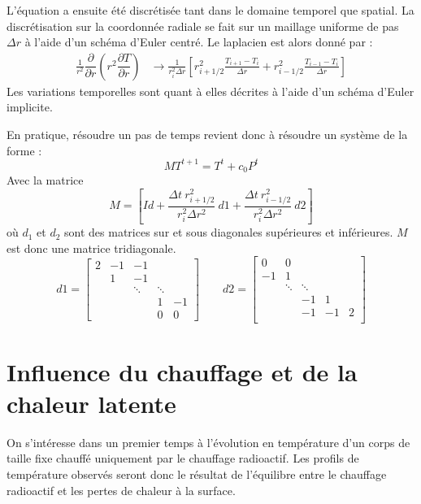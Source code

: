 \documentclass[10pt,a4paper]{article}
\numberwithin{equation}{section}
\begin{document}
L'équation a ensuite été discrétisée tant dans le domaine temporel que spatial. La discrétisation sur la coordonnée radiale se fait sur un maillage uniforme de pas $\Delta r$ à l'aide d'un schéma d'Euler centré. Le laplacien est alors donné par :
\begin{align}
\frac{1}{r^2} \dfrac{\partial }{\partial r}\left( r^2 \dfrac{\partial T}{\partial r} \right) &\rightarrow \frac{1}{r^2_i \Delta r}\left[ r^2_{i+1/2}\frac{T_{i+1} - T_{i}}{\Delta r} + r^2_{i-1/2}\frac{T_{i-1} - T_{i}}{\Delta r} \right]
\end{align}
Les variations temporelles sont quant à elles décrites à l'aide d'un schéma d'Euler implicite.
\medskip

En pratique, résoudre un pas de temps revient donc à résoudre un système de la forme :
\begin{equation}
MT^{t+1} = T^t + c_0 P^{t}
\end{equation}
Avec la matrice $$M = \left[ Id + \frac{\Delta t ~ r^2_{i+1/2}}{r^2_i \Delta r^2} ~ d1 + \frac{\Delta t ~ r^2_{i-1/2}}{r^2_i \Delta r^2} ~ d2  \right]$$
où $d_1$ et $d_2$ sont des matrices sur et sous diagonales supérieures et inférieures. $M$ est donc une matrice tridiagonale.
$$
d1=
\begin{bmatrix}
    2      & -1     & -1       &   \\
           &  1     & -1              &             \\
     &        & \ddots    &\ddots       \\
     &        &            & 1 & -1         \\
         &   &      &   0         &  0
\end{bmatrix}
\qquad
d2=
\begin{bmatrix}
     0     & 0      &   &     &        \\
    -1     & 1      &  &          &            \\
     & \ddots & \ddots &    &      \\
     &              &  -1      &  1         \\
         &      &  -1     & -1        & 2 \\
\end{bmatrix}
$$

\section{Influence du chauffage et de la chaleur latente}
On s'intéresse dans un premier temps à l'évolution en température d'un corps de taille fixe chauffé uniquement par le chauffage radioactif. Les profils de température observés seront donc le résultat de l'équilibre entre le chauffage radioactif et les pertes de chaleur à la surface.
\end{document}
